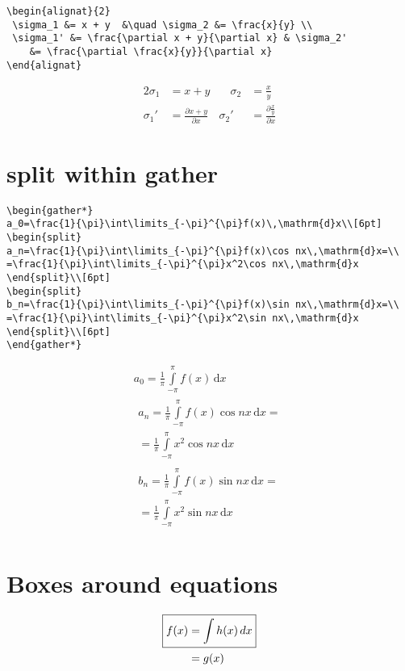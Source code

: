 \documentclass[
  letterpaper,
  DIV=11,
  numbers=noendperiod]{scrreprt}
\begin{document}
\begin{verbatim}
\begin{alignat}{2}
 \sigma_1 &= x + y  &\quad \sigma_2 &= \frac{x}{y} \\   
 \sigma_1' &= \frac{\partial x + y}{\partial x} & \sigma_2' 
    &= \frac{\partial \frac{x}{y}}{\partial x}
\end{alignat}
\end{verbatim}

\begin{alignat}{2}
 \sigma_1 &= x + y  &\quad \sigma_2 &= \frac{x}{y} \\   
 \sigma_1' &= \frac{\partial x + y}{\partial x} & \sigma_2' 
    &= \frac{\partial \frac{x}{y}}{\partial x}
\end{alignat}

\section{split within gather}\label{split-within-gather}

\begin{verbatim}
\begin{gather*}
a_0=\frac{1}{\pi}\int\limits_{-\pi}^{\pi}f(x)\,\mathrm{d}x\\[6pt]
\begin{split}
a_n=\frac{1}{\pi}\int\limits_{-\pi}^{\pi}f(x)\cos nx\,\mathrm{d}x=\\
=\frac{1}{\pi}\int\limits_{-\pi}^{\pi}x^2\cos nx\,\mathrm{d}x
\end{split}\\[6pt]
\begin{split}
b_n=\frac{1}{\pi}\int\limits_{-\pi}^{\pi}f(x)\sin nx\,\mathrm{d}x=\\
=\frac{1}{\pi}\int\limits_{-\pi}^{\pi}x^2\sin nx\,\mathrm{d}x
\end{split}\\[6pt]
\end{gather*}
\end{verbatim}

\begin{gather*}
a_0=\frac{1}{\pi}\int\limits_{-\pi}^{\pi}f(x)\,\mathrm{d}x\\[6pt]
\begin{split}
a_n=\frac{1}{\pi}\int\limits_{-\pi}^{\pi}f(x)\cos nx\,\mathrm{d}x=\\
=\frac{1}{\pi}\int\limits_{-\pi}^{\pi}x^2\cos nx\,\mathrm{d}x
\end{split}\\[6pt]
\begin{split}
b_n=\frac{1}{\pi}\int\limits_{-\pi}^{\pi}f(x)\sin nx\,\mathrm{d}x=\\
=\frac{1}{\pi}\int\limits_{-\pi}^{\pi}x^2\sin nx\,\mathrm{d}x
\end{split}\\[6pt]
\end{gather*}

\section{Boxes around equations}\label{boxes-around-equations}

\begin{align}
\Aboxed{ f(x) & = \int h(x)\, dx} \\
              & = g(x)
\end{align}
\end{document}
